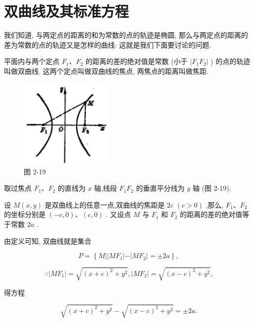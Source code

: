 \documentclass[lang=cn,newtx,12pt,scheme=chinese]{elegantbook}
\begin{document}
\section{双曲线及其标准方程}

我们知道, 与两定点的距离的和为常数的点的轨迹是椭圆, 那么与两定点的距离的差为常数的点的轨迹又是怎样的曲线: 这就是我们下面要讨论的问题.
\begin{definition}[双曲线] 
平面内与两个定点 \({F}_{1}\text{、}{F}_{2}\) 的距离的差的绝对值是常数 (小于 \(\left| {{F}_{1}{F}_{2}}\right|\) ) 的点的轨迹叫做双曲线. 这两个定点叫做双曲线的焦点, 两焦点的距离叫做焦距.
\end{definition}

\begin{figure}[h]
  \centering
  \includegraphics[max width=0.4\textwidth]{images/01912cc2-ffb6-728e-9ae7-b113ff05c64b_97_983208.jpg}
  \caption{图 2-19}
\end{figure}

取过焦点 \({F}_{1}\text{、}{F}_{2}\) 的直线为 \(x\) 轴,线段 \({F}_{1}{F}_{2}\) 的垂直平分线为 \(y\) 轴 (图 2-19).

设 \(M\left( {x,y}\right)\) 是双曲线上的任意一点,双曲线的焦距是 \({2c}\) \(\left( {c > 0}\right)\) ,那么, \({F}_{1}\text{、}{F}_{2}\) 的坐标分别是 \(\left( {-c,0}\right) \text{、}\left( {c,0}\right)\) . 又设点 \(M\) 与 \({F}_{1}\) 和 \({F}_{2}\) 的距离的差的绝对值等于常数 \({2a}\) .

由定义可知, 双曲线就是集合

\[
  P = \left\{ {M\left| \right| M{F}_{1}\left| -\right| M{F}_{2} \mid = \pm {2a}}\right\} ,
\]

\[
  \because \left| {M{F}_{1}}\right| = \sqrt{{\left( x + c\right) }^{2} + {y}^{2}},\left| {M{F}_{2}}\right| = \sqrt{{\left( x - c\right) }^{2} + {y}^{2}}\text{,}
\]

得方程

\[
  \sqrt{{\left( x + c\right) }^{2} + {y}^{2}} - \sqrt{{\left( x - c\right) }^{2} + {y}^{2}} = \pm {2a}.
\]
\end{document}
